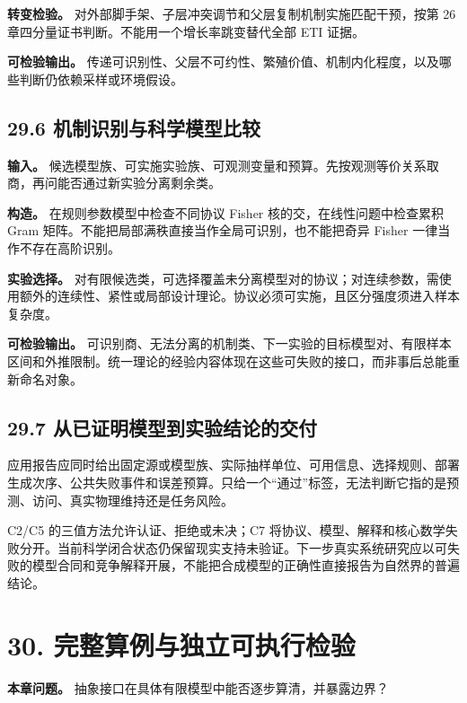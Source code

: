 \documentclass[
  11pt,
  oneside]{book}
\begin{document}
\textbf{转变检验。} 对外部脚手架、子层冲突调节和父层复制机制实施匹配干预，按第 26 章四分量证书判断。不能用一个增长率跳变替代全部 ETI 证据。

\textbf{可检验输出。} 传递可识别性、父层不可约性、繁殖价值、机制内化程度，以及哪些判断仍依赖采样或环境假设。

\section{29.6 机制识别与科学模型比较}\label{ux673aux5236ux8bc6ux522bux4e0eux79d1ux5b66ux6a21ux578bux6bd4ux8f83}

\textbf{输入。} 候选模型族、可实施实验族、可观测变量和预算。先按观测等价关系取商，再问能否通过新实验分离剩余类。

\textbf{构造。} 在规则参数模型中检查不同协议 Fisher 核的交，在线性问题中检查累积 Gram 矩阵。不能把局部满秩直接当作全局可识别，也不能把奇异 Fisher 一律当作不存在高阶识别。

\textbf{实验选择。} 对有限候选类，可选择覆盖未分离模型对的协议；对连续参数，需使用额外的连续性、紧性或局部设计理论。协议必须可实施，且区分强度须进入样本复杂度。

\textbf{可检验输出。} 可识别商、无法分离的机制类、下一实验的目标模型对、有限样本区间和外推限制。统一理论的经验内容体现在这些可失败的接口，而非事后总能重新命名对象。

\section{29.7 从已证明模型到实验结论的交付}\label{ux4eceux5df2ux8bc1ux660eux6a21ux578bux5230ux5b9eux9a8cux7ed3ux8bbaux7684ux4ea4ux4ed8}

应用报告应同时给出固定源或模型族、实际抽样单位、可用信息、选择规则、部署生成次序、公共失败事件和误差预算。只给一个``通过''标签，无法判断它指的是预测、访问、真实物理维持还是任务风险。

C2/C5 的三值方法允许认证、拒绝或未决；C7 将协议、模型、解释和核心数学失败分开。当前科学闭合状态仍保留现实支持未验证。下一步真实系统研究应以可失败的模型合同和竞争解释开展，不能把合成模型的正确性直接报告为自然界的普遍结论。

\chapter{30. 完整算例与独立可执行检验}\label{ch-30}

\textbf{本章问题。} 抽象接口在具体有限模型中能否逐步算清，并暴露边界？
\end{document}

